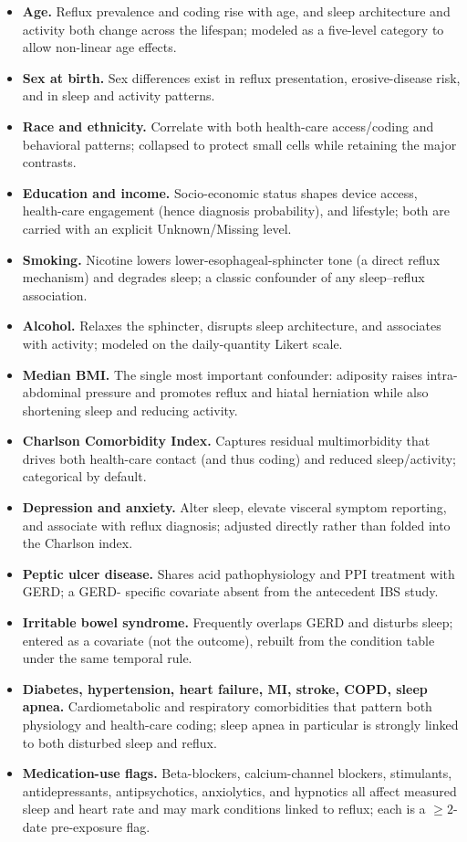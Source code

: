 \documentclass[11pt]{article}
\begin{document}
\begin{itemize}[leftmargin=1.4em,itemsep=3pt]
  \item \textbf{Age.} Reflux prevalence and coding rise with age, and sleep architecture and activity
  both change across the lifespan; modeled as a five-level category to allow non-linear age effects.
  \item \textbf{Sex at birth.} Sex differences exist in reflux presentation, erosive-disease risk, and
  in sleep and activity patterns.
  \item \textbf{Race and ethnicity.} Correlate with both health-care access/coding and behavioral
  patterns; collapsed to protect small cells while retaining the major contrasts.
  \item \textbf{Education and income.} Socio-economic status shapes device access, health-care
  engagement (hence diagnosis probability), and lifestyle; both are carried with an explicit
  Unknown/Missing level.
  \item \textbf{Smoking.} Nicotine lowers lower-esophageal-sphincter tone (a direct reflux mechanism)
  and degrades sleep; a classic confounder of any sleep--reflux association.
  \item \textbf{Alcohol.} Relaxes the sphincter, disrupts sleep architecture, and associates with
  activity; modeled on the daily-quantity Likert scale.
  \item \textbf{Median BMI.} The single most important confounder: adiposity raises intra-abdominal
  pressure and promotes reflux and hiatal herniation while also shortening sleep and reducing activity.
  \item \textbf{Charlson Comorbidity Index.} Captures residual multimorbidity that drives both
  health-care contact (and thus coding) and reduced sleep/activity; categorical by default.
  \item \textbf{Depression and anxiety.} Alter sleep, elevate visceral symptom reporting, and associate
  with reflux diagnosis; adjusted directly rather than folded into the Charlson index.
  \item \textbf{Peptic ulcer disease.} Shares acid pathophysiology and PPI treatment with GERD; a GERD-
  specific covariate absent from the antecedent IBS study.
  \item \textbf{Irritable bowel syndrome.} Frequently overlaps GERD and disturbs sleep; entered as a
  covariate (not the outcome), rebuilt from the condition table under the same temporal rule.
  \item \textbf{Diabetes, hypertension, heart failure, MI, stroke, COPD, sleep apnea.} Cardiometabolic
  and respiratory comorbidities that pattern both physiology and health-care coding; sleep apnea in
  particular is strongly linked to both disturbed sleep and reflux.
  \item \textbf{Medication-use flags.} Beta-blockers, calcium-channel blockers, stimulants,
  antidepressants, antipsychotics, anxiolytics, and hypnotics all affect measured sleep and heart rate
  and may mark conditions linked to reflux; each is a $\geq 2$-date pre-exposure flag.
\end{itemize}
\end{document}
